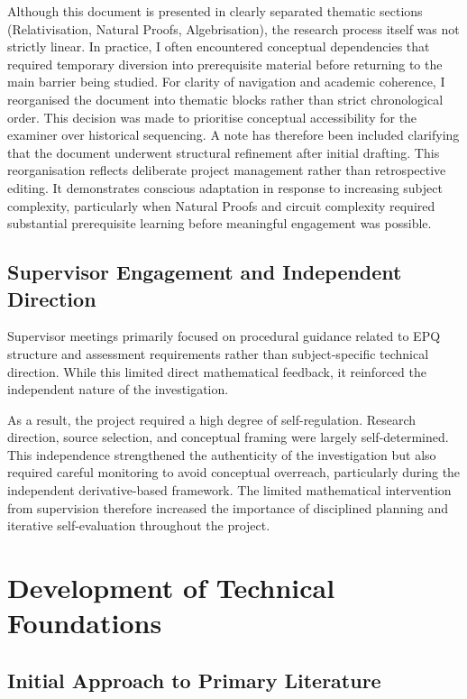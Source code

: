 \documentclass[12pt]{article}
\begin{document}
Although this document is presented in clearly separated thematic sections (Relativisation, Natural Proofs, Algebrisation), the research process itself was not strictly linear.
In practice, I often encountered conceptual dependencies that required temporary diversion into prerequisite material before returning to the main barrier being studied.
For clarity of navigation and academic coherence, I reorganised the document into thematic blocks rather than strict chronological order.
This decision was made to prioritise conceptual accessibility for the examiner over historical sequencing.
A note has therefore been included clarifying that the document underwent structural refinement after initial drafting.
This reorganisation reflects deliberate project management rather than retrospective editing.
It demonstrates conscious adaptation in response to increasing subject complexity, particularly when Natural Proofs and circuit complexity required substantial prerequisite learning before meaningful engagement was possible.

\subsection{Supervisor Engagement and Independent Direction}

Supervisor meetings primarily focused on procedural guidance related to EPQ structure and assessment requirements rather than subject-specific technical direction.
While this limited direct mathematical feedback, it reinforced the independent nature of the investigation.

As a result, the project required a high degree of self-regulation.
Research direction, source selection, and conceptual framing were largely self-determined.
This independence strengthened the authenticity of the investigation but also required careful monitoring to avoid conceptual overreach, particularly during the independent derivative-based framework.
The limited mathematical intervention from supervision therefore increased the importance of disciplined planning and iterative self-evaluation throughout the project.

\section{Development of Technical Foundations}

\subsection{Initial Approach to Primary Literature}
\end{document}
